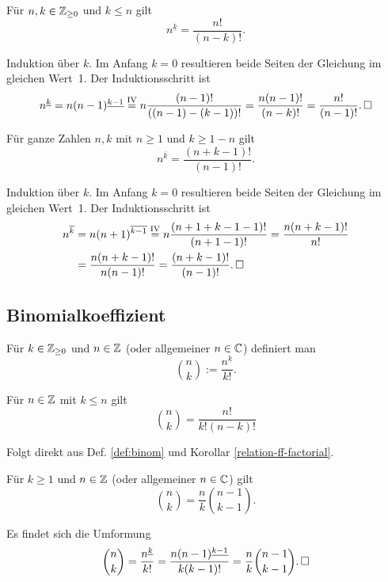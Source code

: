 \begin{Korollar}\label{relation-ff-factorial}
Für $n,k\in\mathbb Z_{\ge 0}$ und $k\le n$ gilt
\[n^{\underline k} = \frac{n!}{(n-k)!}.\]
\end{Korollar}
\begin{Beweis}
Induktion über $k$. Im Anfang $k=0$ resultieren beide Seiten der
Gleichung im gleichen Wert~1. Der Induktionsschritt ist
\[n^{\underline k} = n(n-1)^{\underline{k-1}}
\stackrel{\text{IV}}= n\frac{(n-1)!}{((n-1)-(k-1))!}
= \frac{n(n-1)!}{(n-k)!}
= \frac{n!}{(n-1)!}.\,\square\]
\end{Beweis}

\begin{Korollar}
Für ganze Zahlen $n,k$ mit $n\ge 1$ und $k\ge 1-n$ gilt
\[n^{\overline k} = \frac{(n+k-1)!}{(n-1)!}.\]
\end{Korollar}
\begin{Beweis}
Induktion über $k$. Im Anfang $k=0$ resultieren beide Seiten der
Gleichung im gleichen Wert~1. Der Induktionsschritt ist
\begin{align*}
n^{\overline k} &= n(n+1)^{\overline{k-1}}
\stackrel{\text{IV}}= n\frac{(n+1+k-1-1)!}{(n+1-1)!}
= \frac{n(n+k-1)!}{n!}\\
&= \frac{n(n+k-1)!}{n(n-1)!}
= \frac{(n+k-1)!}{(n-1)!}.\,\square
\end{align*}
\end{Beweis}

\newpage
\subsection{Binomialkoeffizient}

\begin{Definition}[Binomialkoeffizient]\label{def:binom}\newlinefirst
Für $k\in\mathbb Z_{\ge 0}$ und $n\in\mathbb Z$ (oder allgemeiner $n\in\mathbb C$)
definiert man
\[\binom{n}{k} := \frac{n^{\underline k}}{k!}.\]
\end{Definition}

\begin{Korollar}
Für $n\in\mathbb Z$ mit $k\le n$ gilt
\[\binom{n}{k} = \frac{n!}{k!(n-k)!}\]
\end{Korollar}
\begin{Beweis}
Folgt direkt aus Def. \ref{def:binom} und Korollar
\ref{relation-ff-factorial}.\,\qedsymbol
\end{Beweis}

\begin{Korollar}
Für $k\ge 1$ und $n\in\mathbb Z$ (oder allgemeiner $n\in\mathbb C$) gilt
\[\binom{n}{k} = \frac{n}{k}\binom{n-1}{k-1}.\]
\end{Korollar}
\begin{Beweis}
Es findet sich die Umformung
\[\binom{n}{k} = \frac{n^{\underline k}}{k!}
= \frac{n(n-1)^{\underline {k-1}}}{k(k-1)!}
= \frac{n}{k}\binom{n-1}{k-1}.\,\square\]
\end{Beweis}

